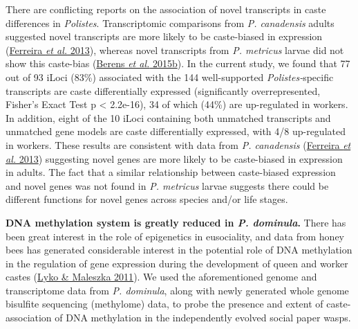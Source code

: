 \documentclass[]{article}
\begin{document}
There are conflicting reports on the association of novel transcripts in
caste differences in \emph{Polistes}. Transcriptomic comparisons from
\emph{P. canadensis} adults suggested novel transcripts are more likely
to be caste-biased in expression
(\protect\hyperlink{ux5fENREFux5f10}{Ferreira \emph{et al.} 2013}),
whereas novel transcripts from \emph{P. metricus} larvae did not show
this caste-bias (\protect\hyperlink{ux5fENREFux5f3}{Berens \emph{et al.}
2015b}). In the current study, we found that 77 out of 93 iLoci (83\%)
associated with the 144 well-supported \emph{Polistes-}specific
transcripts are caste differentially expressed (significantly
overrepresented, Fisher's Exact Test p \textless{} 2.2e-16), 34 of which
(44\%) are up-regulated in workers. In addition, eight of the 10 iLoci
containing both unmatched transcripts and unmatched gene models are
caste differentially expressed, with 4/8 up-regulated in workers. These
results are consistent with data from \emph{P. canadensis}
(\protect\hyperlink{ux5fENREFux5f10}{Ferreira \emph{et al.} 2013})
suggesting novel genes are more likely to be caste-biased in expression
in adults. The fact that a similar relationship between caste-biased
expression and novel genes was not found in \emph{P. metricus} larvae
suggests there could be different functions for novel genes across
species and/or life stages.

\textbf{DNA methylation system is greatly reduced in \emph{P.
dominula}.} There has been great interest in the role of epigenetics in
eusociality, and data from honey bees has generated considerable
interest in the potential role of DNA methylation in the regulation of
gene expression during the development of queen and worker castes
(\protect\hyperlink{ux5fENREFux5f34}{Lyko \& Maleszka 2011}). We used
the aforementioned genome and transcriptome data from \emph{P.
dominula}, along with newly generated whole genome bisulfite sequencing
(methylome) data, to probe the presence and extent of caste-association
of DNA methylation in the independently evolved social paper wasps.
\end{document}
